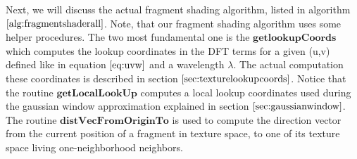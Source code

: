 \label{sec:proceduresdescripton}
Next, we will discuss the actual fragment shading algorithm, listed in algorithm $\ref{alg:fragmentshaderall}$. Note, that our fragment shading algorithm uses some helper procedures. The two most fundamental one is the $\textbf{getlookupCoords}$ which computes the lookup coordinates in the DFT terms for a given (u,v) defined like in equation $\ref{eq:uvw}$ and a wavelength $\lambda$. The actual computation these coordinates is described in section $\ref{sec:texturelookupcoords}$. Notice that the routine $\textbf{getLocalLookUp}$ computes a local lookup coordinates used during the gaussian window approximation explained in section $\ref{sec:gaussianwindow}$. The routine $\textbf{distVecFromOriginTo}$ is used to compute the direction vector from the current position of a fragment in texture space, to one of its texture space living one-neighborhood neighbors.

